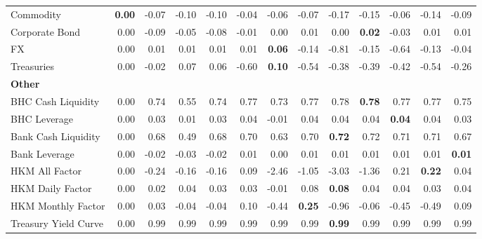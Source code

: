\begin{tabular}{@{}lrrrrrrrrrrrr@{}}
Commodity & \textbf{0.00} & -0.07 & -0.10 & -0.10 & -0.04 & -0.06 & -0.07 & -0.17 & -0.15 & -0.06 & -0.14 & -0.09 \\
Corporate Bond & 0.00 & -0.09 & -0.05 & -0.08 & -0.01 & 0.00 & 0.01 & 0.00 & \textbf{0.02} & -0.03 & 0.01 & 0.01 \\
FX & 0.00 & 0.01 & 0.01 & 0.01 & 0.01 & \textbf{0.06} & -0.14 & -0.81 & -0.15 & -0.64 & -0.13 & -0.04 \\
Treasuries & 0.00 & -0.02 & 0.07 & 0.06 & -0.60 & \textbf{0.10} & -0.54 & -0.38 & -0.39 & -0.42 & -0.54 & -0.26 \\
\midrule
\multicolumn{13}{l}{\textbf{Other}} \\
BHC Cash Liquidity & 0.00 & 0.74 & 0.55 & 0.74 & 0.77 & 0.73 & 0.77 & 0.78 & \textbf{0.78} & 0.77 & 0.77 & 0.75 \\
BHC Leverage & 0.00 & 0.03 & 0.01 & 0.03 & 0.04 & -0.01 & 0.04 & 0.04 & 0.04 & \textbf{0.04} & 0.04 & 0.03 \\
Bank Cash Liquidity & 0.00 & 0.68 & 0.49 & 0.68 & 0.70 & 0.63 & 0.70 & \textbf{0.72} & 0.72 & 0.71 & 0.71 & 0.67 \\
Bank Leverage & 0.00 & -0.02 & -0.03 & -0.02 & 0.01 & 0.00 & 0.01 & 0.01 & 0.01 & 0.01 & 0.01 & \textbf{0.01} \\
HKM All Factor & 0.00 & -0.24 & -0.16 & -0.16 & 0.09 & -2.46 & -1.05 & -3.03 & -1.36 & 0.21 & \textbf{0.22} & 0.04 \\
HKM Daily Factor & 0.00 & 0.02 & 0.04 & 0.03 & 0.03 & -0.01 & 0.08 & \textbf{0.08} & 0.04 & 0.04 & 0.03 & 0.04 \\
HKM Monthly Factor & 0.00 & 0.03 & -0.04 & -0.04 & 0.10 & -0.44 & \textbf{0.25} & -0.96 & -0.06 & -0.45 & -0.49 & 0.09 \\
Treasury Yield Curve & 0.00 & 0.99 & 0.99 & 0.99 & 0.99 & 0.99 & 0.99 & \textbf{0.99} & 0.99 & 0.99 & 0.99 & 0.99 \\
\bottomrule
\end{tabular}
